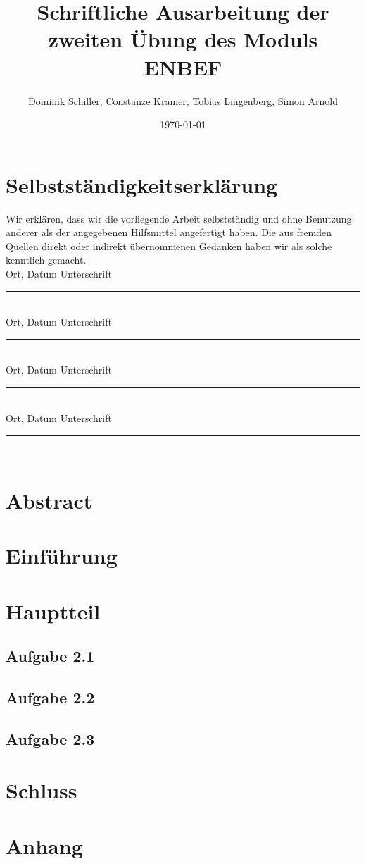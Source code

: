 \documentclass[12p,marginpar=false, accentcolor=TUDa-2c]{tudapub}
\author{Dominik Schiller, Constanze Kramer, Tobias Lingenberg, Simon Arnold}
\date{\today}
\title{Schriftliche Ausarbeitung der zweiten Übung des Moduls ENBEF}
\begin{document}
	\maketitle
	\tableofcontents
	\section{Selbstständigkeitserklärung}
	Wir erklären, dass wir die vorliegende Arbeit selbstständig und ohne Benutzung anderer als der angegebenen Hilfsmittel angefertigt haben. Die aus fremden Quellen direkt oder indirekt übernommenen Gedanken haben wir als solche kenntlich gemacht.\\
	
	
	Ort, Datum Unterschrift \rule{6cm}{0.4pt} \\
	
	Ort, Datum Unterschrift  \rule{6cm}{0.4pt}\\
	
	Ort, Datum Unterschrift \rule{6cm}{0.4pt} \\
	
	Ort, Datum Unterschrift \rule{6cm}{0.4pt} \\
	
	\section{Abstract}
	\section{Einführung}
	\section{Hauptteil}
	\subsection{Aufgabe 2.1}
	\subsection{Aufgabe 2.2}
	\subsection{Aufgabe 2.3}
	\section{Schluss}
	\section{Anhang}
	
\end{document}
